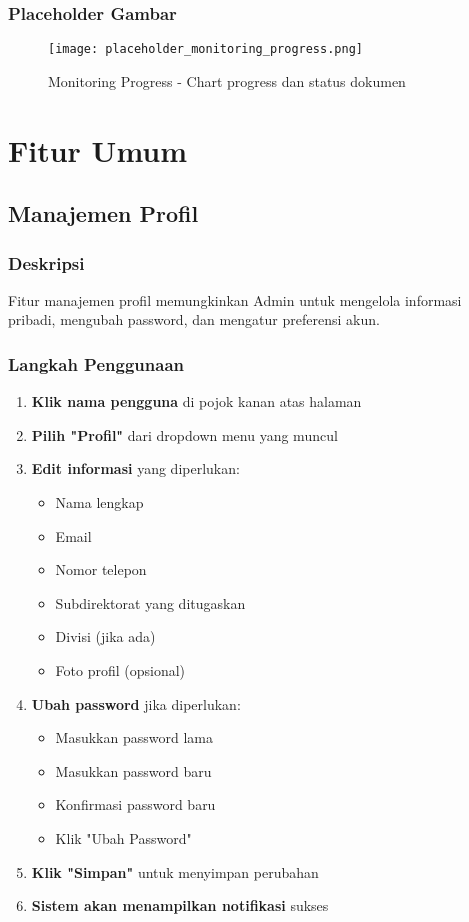 \documentclass[12pt,a4paper]{article}
\begin{document}
\subsubsection{Placeholder Gambar}
\begin{figure}[H]
\centering
\texttt{[image: placeholder\_monitoring\_progress.png]}
\caption{Monitoring Progress - Chart progress dan status dokumen}
\label{fig:monitoring_progress}
\end{figure}

\section{Fitur Umum}

\subsection{Manajemen Profil}

\subsubsection{Deskripsi}
Fitur manajemen profil memungkinkan Admin untuk mengelola informasi pribadi, mengubah password, dan mengatur preferensi akun.

\subsubsection{Langkah Penggunaan}
\begin{enumerate}
\item \textbf{Klik nama pengguna} di pojok kanan atas halaman
\item \textbf{Pilih "Profil"} dari dropdown menu yang muncul
\item \textbf{Edit informasi} yang diperlukan:
\begin{itemize}
\item Nama lengkap
\item Email
\item Nomor telepon
\item Subdirektorat yang ditugaskan
\item Divisi (jika ada)
\item Foto profil (opsional)
\end{itemize}
\item \textbf{Ubah password} jika diperlukan:
\begin{itemize}
\item Masukkan password lama
\item Masukkan password baru
\item Konfirmasi password baru
\item Klik "Ubah Password"
\end{itemize}
\item \textbf{Klik "Simpan"} untuk menyimpan perubahan
\item \textbf{Sistem akan menampilkan notifikasi} sukses
\end{enumerate}
\end{document}
